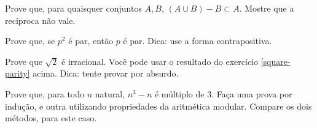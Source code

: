 \begin{exercise}
Prove que, para quaisquer conjuntos $A, B$, $(A \cup B) - B \subset A$. Mostre que a recíproca não vale. 
\end{exercise}

\begin{exercise}
\label{square-parity}
Prove que, se $p^2$ é par, então $p$ é par.
Dica: use a forma contrapositiva.
\end{exercise}

\begin{exercise}
Prove que $\sqrt{2}$ é irracional. Você pode usar o resultado do exercício \ref{square-parity} acima.
Dica: tente provar por absurdo.
\end{exercise}

\begin{exercise}
Prove que, para todo $n$ natural, $n^3 - n$ é múltiplo de 3. Faça uma prova por indução, e outra utilizando propriedades da aritmética modular. Compare os dois métodos, para este caso.
\end{exercise}


